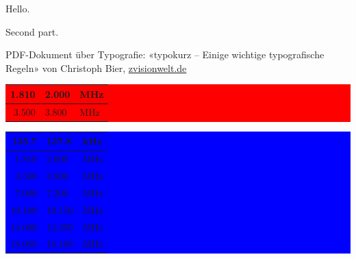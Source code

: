 \documentclass[draft]{article}
\begin{document}
\noindent
\setlength{\fboxsep}{0pt}

\noindent
{}

\noindent
\begin{minipage}{\textwidth}
 \parbox{.2\textwidth}{Hello.}
 \parbox{\dimexpr \textwidth-.2\textwidth}{Second part.}
\end{minipage}


\noindent
\begin{minipage}{\textwidth}
 \parbox[t]{1.2cm}{  }
 \parbox[t]{\dimexpr \textwidth-1.2cm}{PDF-Dokument über Typografie: «typokurz -- Einige wichtige typografische Regeln» von Christoph Bier, \href{http://www.zvisionwelt.de}{zvisionwelt.de} }
\end{minipage}



\begin{minipage}[t]{\textwidth}
\colorbox{red}{
\begin{minipage}[t]{.45\textwidth}
\begin{tabular}{r @{---} l l}
1.810 & 2.000 & MHz \\ \midrule
3.500 & 3.800 & MHz \\ \midrule
\end{tabular}
\end{minipage}
}
\colorbox{blue}{
\begin{minipage}[t]{.45\textwidth}
\begin{tabular}{r @{---} l l}
 135.7 & 137.8 & kHz \\ \midrule
1.810 & 2.000 & MHz \\ \midrule
3.500 & 3.800 & MHz \\ \midrule
7.000 & 7.200 & MHz \\ \midrule
10.100 & 10.150 & MHz \\ \midrule
14.000 & 14.350 & MHz \\ \midrule
18.068 & 18.168 & MHz \\ \midrule
\end{tabular}
\end{minipage}
}
\end{minipage}
\end{document}
